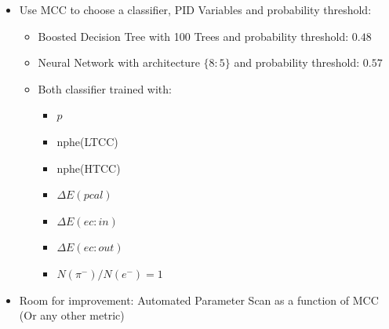 \documentclass[xcolor=table, xcolor=dvipsnames]{beamer}
\begin{document}
\begin{frame}
\begin{columns}
  
   \begin{column}{7cm}
        \begin{itemize}
    \item Use MCC to choose a classifier, PID Variables and probability threshold:
    \begin{itemize}
      \scriptsize
      \item Boosted Decision Tree with 100 Trees and probability threshold: $0.48$
      \item Neural Network with architecture $\{8 : 5\}$ and probability threshold: $0.57$
      \item Both classifier trained with:
      \begin{itemize}
        \scriptsize
        \item  $p$
        \item nphe(LTCC)
        \item nphe(HTCC)
        \item $\Delta E(pcal)$
        \item $\Delta E(ec:in)$
        \item $\Delta E(ec:out)$
        \item $N(\pi^{-}) / N(e^{-}) = 1$
      \end{itemize}   
   \end{itemize}
   \item Room for improvement: Automated Parameter Scan as a function of MCC \\ (Or any other metric)
     \end{itemize}
   \end{column}
 \end{columns}
\end{frame}
\end{document}
